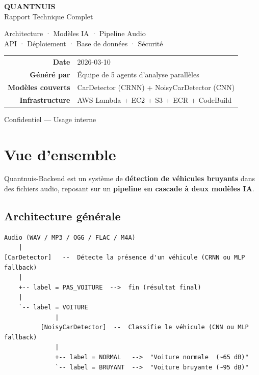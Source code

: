 \documentclass[11pt,a4paper]{article}
\begin{document}
\begin{titlepage}
  \centering
  \vspace*{3cm}

  {\fontsize{36}{44}\selectfont\bfseries\color{sectioncolor} QUANTNUIS}\\[0.4cm]
  {\fontsize{22}{28}\selectfont\color{accentcolor} Rapport Technique Complet}\\[2cm]

  \begin{mdframed}[backgroundcolor=gray!8,linecolor=accentcolor,linewidth=1pt]
    \centering\large
    Architecture · Modèles IA · Pipeline Audio\\
    API · Déploiement · Base de données · Sécurité
  \end{mdframed}

  \vspace{2cm}

  \begin{tabular}{rl}
    \textbf{Date} & 2026-03-10 \\[4pt]
    \textbf{Généré par} & Équipe de 5 agents d'analyse parallèles \\[4pt]
    \textbf{Modèles couverts} & CarDetector (CRNN) + NoisyCarDetector (CNN) \\[4pt]
    \textbf{Infrastructure} & AWS Lambda + EC2 + S3 + ECR + CodeBuild \\
  \end{tabular}

  \vfill
  {\small\color{gray} Confidentiel — Usage interne}
\end{titlepage}

\tableofcontents
\newpage

\section{Vue d'ensemble}

Quantnuis-Backend est un système de \textbf{détection de véhicules bruyants} dans des
fichiers audio, reposant sur un \textbf{pipeline en cascade à deux modèles IA}.

\subsection{Architecture générale}

\begin{lstlisting}[style=tree,caption={Pipeline de détection en cascade}]
Audio (WAV / MP3 / OGG / FLAC / M4A)
    |
[CarDetector]   --  Détecte la présence d'un véhicule (CRNN ou MLP fallback)
    |
    +-- label = PAS_VOITURE  -->  fin (résultat final)
    |
    `-- label = VOITURE
              |
          [NoisyCarDetector]  --  Classifie le véhicule (CNN ou MLP fallback)
              |
              +-- label = NORMAL   -->  "Voiture normale  (~65 dB)"
              `-- label = BRUYANT  -->  "Voiture bruyante (~95 dB)"
\end{lstlisting}
\end{document}
